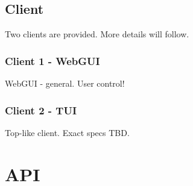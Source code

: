 \documentclass[a4paper]{article}
\begin{document}
\subsection{Client}
Two clients are provided. More details will follow.
\subsubsection{Client 1 - WebGUI}
	WebGUI - general. User control!
\subsubsection{Client 2 - TUI}
	Top-like client. Exact specs TBD.
\clearpage
\section{API}
\end{document}
